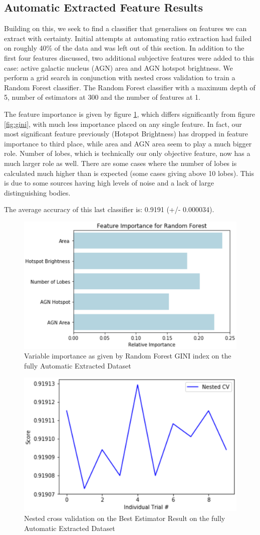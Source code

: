 \documentclass[conference]{IEEEtran}
\begin{document}
\subsection{Automatic Extracted Feature Results}

Building on this, we seek to find a classifier that generalises on features we can extract with certainty. Initial attempts at automating ratio extraction had failed on roughly 40\% of the data and was left out of this section. In addition to the first four features discussed, two additional subjective features were added to this case: active galactic nucleus (AGN) area and AGN hotspot brightness. We perform a grid search in conjunction with nested cross validation to train a Random Forest classifier. The Random Forest classifier with a maximum depth of 5, number of estimators at 300 and the number of features at 1.

The feature importance is given by figure \ref{fig:agnfeat}, which differs significantly from figure \ref{fig:gini}, with much less importance placed on any single feature. In fact, our most significant feature previously (Hotspot Brightness) has dropped in feature importance to third place, while area and AGN area seem to play a much bigger role. Number of lobes, which is technically our only objective feature, now has a much larger role as well. There are some cases where the number of lobes is calculated much higher than is expected (some cases giving above 10 lobes). This is due to some sources having high levels of noise and a lack of large distinguishing bodies. 

The average accuracy of this last classifier is: 0.9191 (+/- 0.000034).

\begin{figure}[h]
    \centering
    \includegraphics[width=0.5 \textwidth]{EPS/agnfeat.eps}
    \caption{Variable importance as given by Random Forest GINI index on the fully Automatic Extracted Dataset}
    \label{fig:agnfeat}
\end{figure}
\begin{figure}[h]
    \centering
    \includegraphics[width=0.5 \textwidth]{EPS/nestedlast.eps}
    \caption{Nested cross validation on the Best Estimator Result on the fully Automatic Extracted Dataset}
    \label{fig:nested2}
\end{figure}
\end{document}

